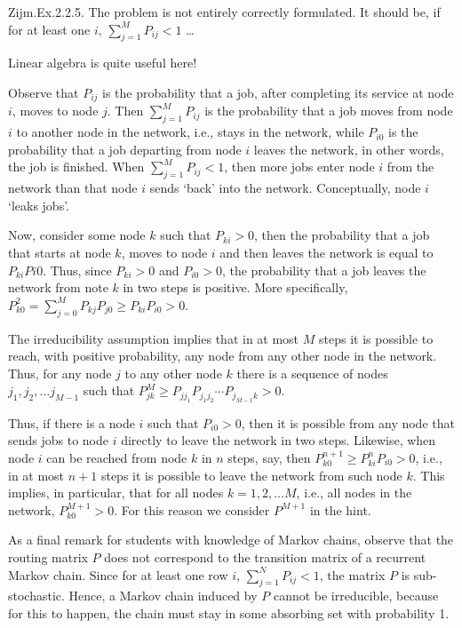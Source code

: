 \begin{question}
  Zijm.Ex.2.2.5. The problem is not entirely correctly formulated. It
  should be, if for at least one $i$, $\sum_{j=1}^M P_{ij} <1$ \ldots
\begin{solution}
Linear algebra is quite useful here!

Observe that $P_{ij}$ is the probability that a job, after completing
its service at node $i$, moves to node $j$. Then $\sum_{j=1}^M P_{ij}$
is the probability that a job moves from node $i$ to another node in
the network, i.e., stays in the network, while $P_{i0}$ is the
probability that a job departing from node $i$ leaves the network, in
other words, the job is finished. When $\sum_{j=1}^M P_{ij} < 1$, then
more jobs enter node $i$ from the network than that node $i$ sends
`back' into the network. Conceptually, node $i$ `leaks jobs'.

  Now, consider some node $k$ such that $P_{ki} > 0$, then the
  probability that a job that starts at node $k$, moves to node $i$
  and then leaves the network is equal to $P_{ki}P{i0}$. Thus, since
  $P_{ki}>0$ and $P_{i0}>0$, the probability that a job leaves the
  network from note $k$ in two steps is positive.  More specifically,
  $P^2_{k0} = \sum_{j=0}^M P_{kj}P_{j0} \geq P_{ki}P_{i0} > 0$. 

  The irreducibility assumption implies that in at most $M$ steps it
  is possible to reach, with positive probability, any node from any
  other node in the network. Thus, for any node $j$ to any other node
  $k$ there is a sequence of nodes $j_1, j_2, \ldots j_{M-1}$ such
  that  $P^{M}_{jk} \geq P_{j j_1}P_{j_1 j_2}\cdots P_{j_{M-1}k} > 0$.


  Thus, if there is a node $i$ such that $P_{i0}>0$, then it is
  possible from any node that sends jobs to node $i$ directly to leave
  the network in two steps. Likewise, when node $i$ can be reached
  from node $k$ in $n$ steps, say, then
  $P^{n+1}_{k0} \geq P^n_{ki}P_{i0} > 0$, i.e., in at most $n+1$ steps
  it is possible to leave the network from such node $k$. This
  implies, in particular, that for all nodes $k=1,2,\ldots M$, i.e.,
  all nodes in the network, $P^{M+1}_{k0} >0$.  For this reason we
  consider $P^{M+1}$ in the hint.




  As a final remark for students with knowledge of Markov chains,
  observe that the routing matrix $P$ does not correspond to the
  transition matrix of a recurrent Markov chain. Since for at least
  one row $i$, $\sum_{j=1}^N P_{ij}<1$, the matrix $P$ is
  sub-stochastic. Hence, a Markov chain induced by $P$ cannot be
  irreducible, because for this to happen, the chain must stay in some
  absorbing set with probability 1.
\end{solution}
\end{question}

